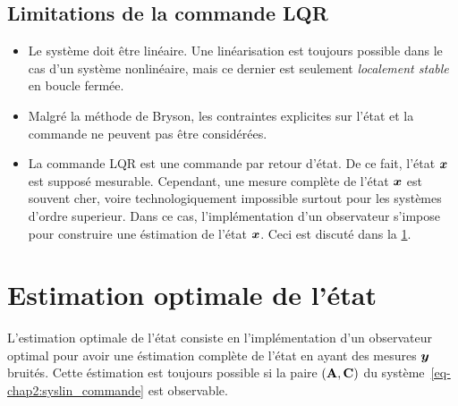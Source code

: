 \subsection{Limitations de la commande LQR}
\begin{itemize}
	\item Le système doit être linéaire. Une linéarisation est toujours possible dans le cas d'un système nonlinéaire, mais ce dernier est seulement \emph{localement stable} en boucle  fermée.
	\item Malgré la méthode de Bryson, les  contraintes explicites sur l'état et la commande ne peuvent pas être considérées. 
	\item La commande LQR est une commande par retour d'état. De ce fait, l'état $\bm{x}$ est supposé mesurable. Cependant, une mesure complète de l'état $\bm{x}$ est souvent cher, voire technologiquement impossible surtout pour les systèmes d'ordre superieur. Dans ce cas, l'implémentation d'un observateur s'impose pour construire une éstimation  de  l'état $\bm{x}$. Ceci est discuté dans la \cref{sec-chap2:optimal estimation}.
\end{itemize}
\section{Estimation optimale de l'état}\label{sec-chap2:optimal estimation}
L'estimation optimale de l'état consiste en l'implémentation d'un observateur optimal pour avoir une éstimation complète de l'état en ayant des mesures $\bm{y}$ bruités. Cette éstimation est toujours possible si la paire $(\mathbf{A},\mathbf{C})$ du système~\eqref{eq-chap2:syslin_commande} est observable. 


